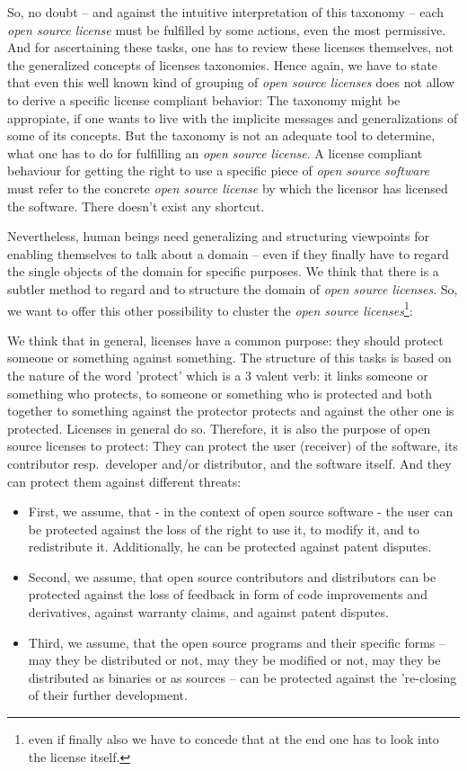 So, no doubt -- and against the intuitive interpretation of this taxonomy -- each
\emph{open source license} must be fulfilled by some actions, even the most
permissive. And for ascertaining these tasks, one has to review these licenses
themselves, not the generalized concepts of licenses taxonomies. Hence again, we
have to state that even this well known kind of grouping of \emph{open source
licenses} does not allow to derive a specific license compliant behavior: The
taxonomy might be appropiate, if one wants to live with the implicite messages
and generalizations of some of its concepts. But the taxonomy is not an adequate
tool to determine, what one has to do for fulfilling an \emph{open source
license}. A license compliant behaviour for getting the right to use a specific
piece of \emph{open source software} must refer to the concrete \emph{open
source license} by which the licensor has licensed the software. There doesn't
exist any shortcut.

Nevertheless, human beings need generalizing and structuring viewpoints for
enabling themselves to talk about a domain -- even if they finally have to regard
the single objects of the domain for specific purposes. We think that there is
a subtler method to regard and to structure the domain of \emph{open source
licenses}. So, we want to offer this other possibility to cluster the \emph{open
source licenses}\footnote{even if finally also we have to concede that at the
end one has to look into the license itself.}:

We think that in general, licenses have a common purpose: they should protect
someone or something against something. The structure of this tasks is based on
the nature of the word 'protect' which is a 3 valent verb: it links someone or
something who protects, to someone or something who is protected and both
together to something against the protector protects and against the other one
is protected. Licenses in general do so. Therefore, it is also the purpose of
open source licenses to protect: They can protect the user (receiver) of the
software, its contributor resp.\ developer and/or distributor, and the software
itself. And they can protect them against different threats:

\begin{itemize}
  \item First, we assume, that - in the context of open source software - the
  user can be protected against the loss of the right to use it, to modify it,
  and to redistribute it. Additionally, he can be protected against patent
  disputes.
  \item Second, we assume, that open source contributors and distributors can be
  protected against the loss of feedback in form of code improvements and
  derivatives, against warranty claims, and against patent disputes.
  \item Third, we assume, that the open source programs and their specific forms
  -- may they be distributed or not, may they be modified or not, may they be
  distributed as binaries or as sources -- can be protected against the
  're-closing of their further development.
\end{itemize}

